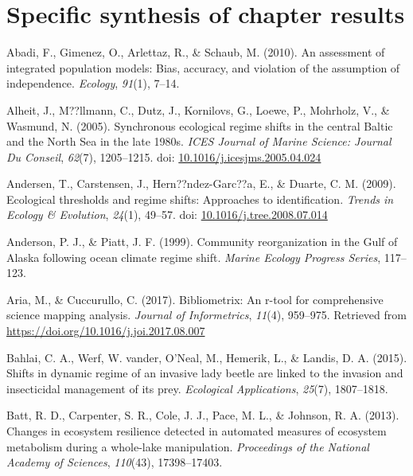 \documentclass[12pt,twoside,openany]{reedthesis}
\begin{document}
\hypertarget{specific-synthesis-of-chapter-results}{%
\section{Specific synthesis of chapter results}\label{specific-synthesis-of-chapter-results}}

\hypertarget{refs}{}
\leavevmode\hypertarget{ref-abadi2010assessment}{}%
Abadi, F., Gimenez, O., Arlettaz, R., \& Schaub, M. (2010). An assessment of integrated population models: Bias, accuracy, and violation of the assumption of independence. \emph{Ecology}, \emph{91}(1), 7--14.

\leavevmode\hypertarget{ref-alheit_synchronous_2005}{}%
Alheit, J., M??llmann, C., Dutz, J., Kornilovs, G., Loewe, P., Mohrholz, V., \& Wasmund, N. (2005). Synchronous ecological regime shifts in the central Baltic and the North Sea in the late 1980s. \emph{ICES Journal of Marine Science: Journal Du Conseil}, \emph{62}(7), 1205--1215. doi: \href{https://doi.org/10.1016/j.icesjms.2005.04.024}{10.1016/j.icesjms.2005.04.024}

\leavevmode\hypertarget{ref-andersen_ecological_2009}{}%
Andersen, T., Carstensen, J., Hern??ndez-Garc??a, E., \& Duarte, C. M. (2009). Ecological thresholds and regime shifts: Approaches to identification. \emph{Trends in Ecology \& Evolution}, \emph{24}(1), 49--57. doi: \href{https://doi.org/10.1016/j.tree.2008.07.014}{10.1016/j.tree.2008.07.014}

\leavevmode\hypertarget{ref-anderson_community_1999}{}%
Anderson, P. J., \& Piatt, J. F. (1999). Community reorganization in the Gulf of Alaska following ocean climate regime shift. \emph{Marine Ecology Progress Series}, 117--123.

\leavevmode\hypertarget{ref-bibliometrix}{}%
Aria, M., \& Cuccurullo, C. (2017). Bibliometrix: An r-tool for comprehensive science mapping analysis. \emph{Journal of Informetrics}, \emph{11}(4), 959--975. Retrieved from \url{https://doi.org/10.1016/j.joi.2017.08.007}

\leavevmode\hypertarget{ref-bahlai2015shifts}{}%
Bahlai, C. A., Werf, W. vander, O'Neal, M., Hemerik, L., \& Landis, D. A. (2015). Shifts in dynamic regime of an invasive lady beetle are linked to the invasion and insecticidal management of its prey. \emph{Ecological Applications}, \emph{25}(7), 1807--1818.

\leavevmode\hypertarget{ref-batt2013changes}{}%
Batt, R. D., Carpenter, S. R., Cole, J. J., Pace, M. L., \& Johnson, R. A. (2013). Changes in ecosystem resilience detected in automated measures of ecosystem metabolism during a whole-lake manipulation. \emph{Proceedings of the National Academy of Sciences}, \emph{110}(43), 17398--17403.
\end{document}
